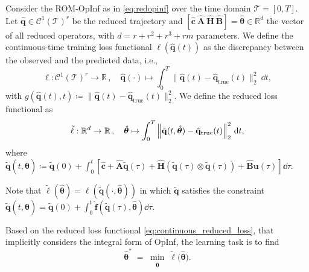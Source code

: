 \begin{definition} 
    \label{def:continuous_loss}
    Consider the ROM-OpInf as in \eqref{eq:redopinf} over the time domain $\mathcal{T}=[0,T]$. Let $\hat{\mathbf{q}}\in\mathcal{C}^1(\mathcal{T})^r$ be the reduced trajectory and $[\hat{\mathbf{c}}~\hat{\mathbf{A}}~\hat{\mathbf{H}}~\hat{\mathbf{B}}]=\hat{\bm{\theta}}\in\mathbb{R}^d$ the vector of all reduced operators, with $d=r+r^2+r^3+rm$ parameters. We define the continuous-time training loss functional $\ell(\hat{\mathbf{q}}(t))$ as the discrepancy between the observed and the predicted data, i.e.,\\
    \begin{equation}
        \ell: \mathcal{C}^1(\mathcal{T})^r  \to \mathbb{R}\,,\quad \hat{\mathbf{q}}(\cdot) \mapsto \int_0^T \Big\|\hat{\mathbf{q}}(t) - \hat{\mathbf{q}}_\mathrm{true}(t)\Big\|_2^2~\dd t,
        \label{eq:continuous_loss}
    \end{equation}
    with $g(\hat{\mathbf{q}}(t),t) \coloneqq \Big\|\hat{\mathbf{q}}(t) - \hat{\mathbf{q}}_\mathrm{true}(t)\Big\|_2^2$. We define the reduced loss functional as\\ 
    \begin{equation}
        \tilde{\ell}: \mathbb{R}^d  \to \mathbb{R}\,,\quad \hat{\bm{\theta}} \mapsto \int_0^T \norm{\tilde{\mathbf{q}}(t,\hat{\bm{\theta}}) - \hat{\mathbf{q}}_\mathrm{true}(t)}_2^2~\dd t,
        \label{eq:continuous_reduced_loss}
    \end{equation}
    where $\tilde{\mathbf{q}}(t, \hat{\bm{\theta}}) \coloneqq \tilde{\mathbf{q}}(0) + \displaystyle\int_{0}^t\left[ \hat{\mathbf{c}} + \hat{\mathbf{A}}\tilde{\mathbf{q}}(\tau) + \hat{\mathbf{H}}\left(\tilde{\mathbf{q}}(\tau)\otimes\tilde{\mathbf{q}}(\tau) \right) +\hat{\mathbf{B}}\mathbf{u}(\tau) \right]\dd \tau $.

\end{definition}
Note that $\tilde{\ell}(\hat{\bm{\theta}}) = \ell(\tilde{\mathbf{q}}(\cdot,\hat{\bm{\theta}}))$ in which $\tilde{\mathbf{q}}$ satisfies the constraint $\tilde{\mathbf{q}}(t, \hat{\bm{\theta}}) = \tilde{\mathbf{q}}(0) + \displaystyle\int_{0}^t \hat{\mathbf{f}}(\tilde{\mathbf{q}}(\tau),\hat{\bm{\theta}})\dd \tau $.

Based on the reduced loss functional \eqref{eq:continuous_reduced_loss}, that implicitly considers the integral form of OpInf, the learning task is to find\\
\begin{equation}
  \hat{\bm{\theta}}^*
  \;=\;
  \min_{\hat{\bm{\theta}}}\;
  \tilde{\ell}\bigl(\hat{\bm{\theta}}\bigr).
\end{equation}

